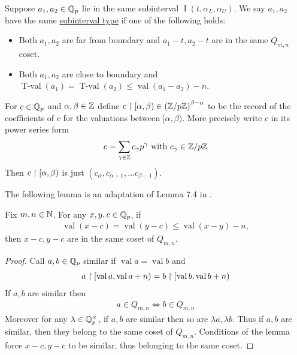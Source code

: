 \documentclass{amsart}
\newcommand{\paren}[1]{\left(#1\right)}
\DeclareMathOperator{\val}{val}
\DeclareMathOperator{\vval}{val}
\DeclareMathOperator{\tval}{T-val}
\DeclareMathOperator{\inti}{I}
\newcommand{\defn}{\underline}
\newcommand{\interval}{\inti(t, \alpha_L, \alpha_U)}
\begin{document}
\begin{Definition}
  Suppose $a_1, a_2 \in \mathbb{Q}_p$ lie in the same subinterval $\interval$.
  We say $a_1, a_2$ have the same \defn{subinterval type} if one of the following holds:
  \begin{itemize}
  \item Both $a_1, a_2$ are far from boundary and $a_1 - t, a_2 - t$ are in the same $Q_{m,n}$ coset.
  \item Both $a_1, a_2$ are close to boundary and $ \tval(a_1) = \tval(a_2) \leq \vval(a_1 - a_2) - n$.
  \end{itemize}      
\end{Definition}


\begin{Definition}
	For $c \in \mathbb{Q}_p$ and $\alpha, \beta \in \mathbb{Z}$ define $c \midr [\alpha, \beta) \in \paren{\Z/p\Z}^{\beta - \alpha}$
  to be the record of the coefficients of $c$ for the valuations between $[\alpha, \beta)$.
  More precisely write $c$ in its power series form
  \begin{align*}
    c = \sum_{\gamma \in \mathbb{Z}} c_\gamma p^\gamma \text{ with } c_\gamma \in \mathbb{Z}/p\mathbb{Z}
  \end{align*}
  Then $c \upharpoonright [\alpha, \beta)$ is just $(c_\alpha, c_{\alpha+1}, \ldots c_{\beta - 1})$.
\end{Definition}

The following lemma is an adaptation of Lemma 7.4 in \cite{density}.
\begin{Lemma} \label{distance}
  Fix $m,n \in \mathbb{N}$.
  For any $x,y,c \in \mathbb{Q}_p$, if
  \begin{align*}
    \val (x - c) = \val (y - c) \leq \val (x - y) - n,
  \end{align*}
  then $x - c, y - c$ are in the same coset of $Q_{m,n}$.
\end{Lemma}
\begin{proof}
  Call $a,b \in \mathbb{Q}_p$ similar if $\val a = \val b$ and
  \begin{align*}
    a \midr [\val a, \val a + n) = b \midr [\val b, \val b + n)
  \end{align*}
  If $a,b$ are similar then
  \begin{align*}
    a \in Q_{m,n} \iff b \in Q_{m,n}
  \end{align*}
  Moreover for any $\lambda \in \mathbb{Q}_p^\times$, if $a,b$ are similar then so are $\lambda a, \lambda b$.
  Thus if $a,b$ are similar, then they belong to the same coset of $Q_{m,n}$.
  Conditions of the lemma force $x - c, y - c$ to be similar, thus belonging to the same coset.
\end{proof} 
\end{document}
